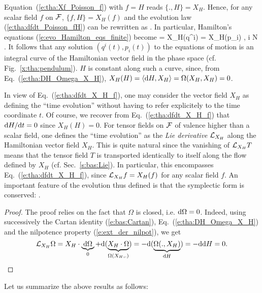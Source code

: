 Equation~(\ref{e:tha:Xf_Poisson_f}) with $f=H$
reads $\{. ,H\} = X_H$. Hence, for any scalar field $f$ on $\mathcal{F}$,
$\{f,H\} = X_H(f)$ and the evolution law (\ref{e:tha:dfdt_Poisson_fH}) can be rewritten as
\be \label{e:tha:dfdt_X_H_f}
    .
\ee
In particular, Hamilton's equations (\ref{e:evo_Hamilton_eqs_finite}) become
\be \label{e:evo_Hamilton_eqs_X_H}
     = X_H(q^i) \qand {} = X_H(p_i) ,  \leq i \leq N .
\ee
It follows that any solution $(q^i(t),p_i(t))$ to the equations of motion is an
integral curve of the Hamiltonian vector field in the phase space
(cf. Fig.~\ref{x:tha:pendulum}). $H$ is constant along such a curve, since,
from Eq.~(\ref{e:tha:DH_Omega_X_H}),
$X_H(H) = \langle \mathrm{d} H, X_H \rangle = \Omega(X_H, X_H) = 0$.

In view of Eq.~(\ref{e:tha:dfdt_X_H_f}), one may consider the vector field $X_H$ as
defining the ``time evolution'' without having to refer explicitely
to the time coordinate $t$.
Of course, we recover from Eq.~(\ref{e:tha:dfdt_X_H_f})
that $\mathrm{d} H/\mathrm{d} t = 0$ since $X_H(H) = 0$.
For tensor fields on $\mathcal{F}$ of valence higher than a scalar field,
one  defines the ``time evolution'' as the
\emph{Lie derivative} $\mathcal{L}_{X_H}$ along the Hamiltonian vector field $X_H$.
This is quite natural since the vanishing of $\mathcal{L}_{X_H} T$ means
that the tensor field $T$ is transported identically to itself along the flow
defined by $X_H$ (cf. Sec.~\ref{s:bas:Lie}).
In particular, this encompasses Eq.~(\ref{e:tha:dfdt_X_H_f}), since
$\mathcal{L}_{X_H} f = X_H(f)$ for any scalar field $f$.
An important feature of the evolution thus defined is that
the symplectic form is conserved:
\be \label{e:tha:Lie_X_H_Omega}
   .
\ee
\begin{proof}
The proof relies on the fact that $\Omega$ is closed, i.e. $\mathrm{d}\Omega = 0$.
Indeed, using successively the Cartan
identity (\ref{e:bas:Cartan}), Eq.~(\ref{e:tha:DH_Omega_X_H})
and the nilpotence property (\ref{e:ext_der_nilpot}), we get
\[
     \mathcal{L}_{X_H} \Omega  = X_H \cdot \underbrace{\mathrm{d} \Omega}_{0}
     + \mathrm{d}(\underbrace{X_H\cdot\Omega}_{\Omega(X_H, .)})
     = - \mathrm{d}(\underbrace{\Omega(., X_H)}_{\mathrm{d} H})
     = - \mathrm{d} \mathrm{d} H = 0 .
\]
\end{proof}

Let us summarize the above results as follows:

